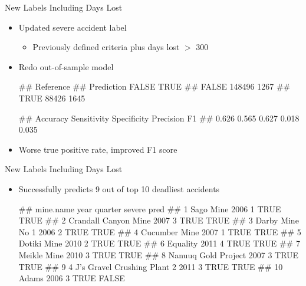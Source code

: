 \documentclass[]{beamer}
\providecommand{\tightlist}{%
  \setlength{\itemsep}{0pt}\setlength{\parskip}{0pt}}
\let\oldverbatim\verbatim
\let\endoldverbatim\endverbatim
\renewenvironment{verbatim}{\footnotesize\oldverbatim}{\endoldverbatim}
\begin{document}
\begin{frame}[fragile]{New Labels Including Days Lost}

\begin{itemize}[<+->]
\tightlist
\item
  Updated severe accident label

  \begin{itemize}[<+->]
  \tightlist
  \item
    Previously defined criteria plus days lost \(>\) 300
  \end{itemize}
\item
  Redo out-of-sample model

\begin{verbatim}
##           Reference
## Prediction  FALSE   TRUE
##      FALSE 148496   1267
##      TRUE   88426   1645
\end{verbatim}

\begin{verbatim}
##    Accuracy Sensitivity Specificity   Precision          F1 
##       0.626       0.565       0.627       0.018       0.035
\end{verbatim}

\item
  Worse true positive rate, improved F1 score
\end{itemize}

\end{frame}

\begin{frame}[fragile]{New Labels Including Days Lost}

\begin{itemize}[<+->]
\tightlist
\item
  Successfully predicts 9 out of top 10 deadliest accidents


\begin{verbatim}
##                        mine.name year quarter severe  pred
## 1                      Sago Mine 2006       1   TRUE  TRUE
## 2           Crandall Canyon Mine 2007       3   TRUE  TRUE
## 3                Darby Mine No 1 2006       2   TRUE  TRUE
## 4                  Cucumber Mine 2007       1   TRUE  TRUE
## 5                    Dotiki Mine 2010       2   TRUE  TRUE
## 6                       Equality 2011       4   TRUE  TRUE
## 7                    Meikle Mine 2010       3   TRUE  TRUE
## 8            Nanuuq Gold Project 2007       3   TRUE  TRUE
## 9  4 J's Gravel Crushing Plant 2 2011       3   TRUE  TRUE
## 10                         Adams 2006       3   TRUE FALSE
\end{verbatim}
\end{itemize}
\end{frame}
\end{document}
